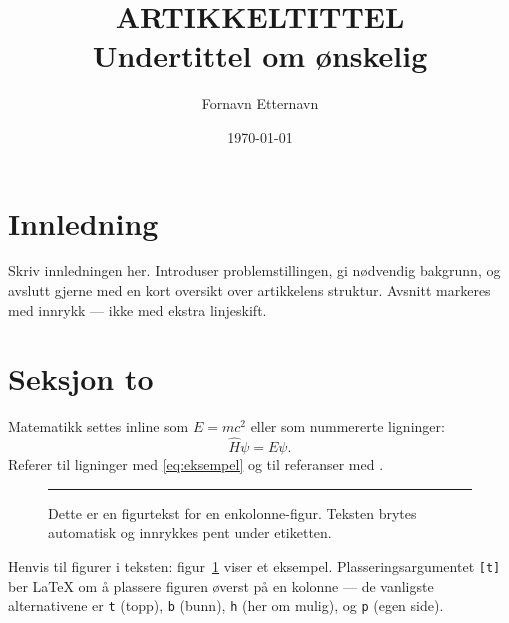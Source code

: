 \documentclass[a4paper,10pt,twocolumn]{article}
\title{ARTIKKELTITTEL\\[0.4em]
{\large Undertittel om ønskelig}}
\author{Fornavn Etternavn}
\date{\today}
\begin{document}

\section{Innledning}

Skriv innledningen her. Introduser problemstillingen, gi nødvendig
bakgrunn, og avslutt gjerne med en kort oversikt over artikkelens
struktur. Avsnitt markeres med innrykk --- ikke med ekstra
linjeskift.

\section{Seksjon to}

Matematikk settes inline som $E = mc^2$ eller som nummererte
ligninger:
\begin{equation}
  \hat{H}\psi = E\psi.
  \label{eq:eksempel}
\end{equation}
Referer til ligninger med \eqref{eq:eksempel} og til
referanser med \cite{eksempel2024}.

\begin{figure}[t]
  \centering
  \rule{0.9\linewidth}{3cm}     %
  \caption{Dette er en figurtekst for en enkolonne-figur.
           Teksten brytes automatisk og innrykkes pent under
           etiketten.}
  \label{fig:enkel}
\end{figure}

Henvis til figurer i teksten: figur~\ref{fig:enkel} viser et
eksempel. Plasseringsargumentet \texttt{[t]} ber LaTeX om å
plassere figuren øverst på en kolonne --- de vanligste
alternativene er \texttt{t} (topp), \texttt{b} (bunn),
\texttt{h} (her om mulig), og \texttt{p} (egen side).
\end{document}
